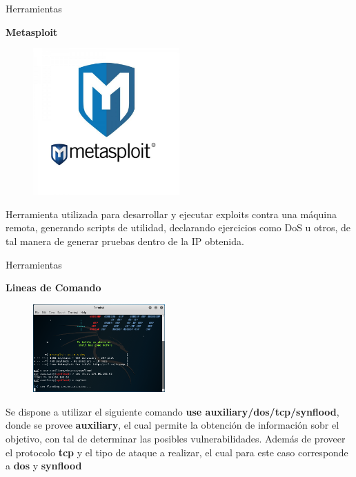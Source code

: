\begin{frame}[t,fragile]{Herramientas}

\textbf{Metasploit}

\begin{figure} 
\vspace{2pt}
  \begin{center}
    \includegraphics[width=0.5\textwidth]{meta.jpg}
    \label{fig:databaseUserTable}
  \end{center}
  \vspace{2pt}
\end{figure} 

\bigskip

 Herramienta  utilizada para desarrollar y ejecutar exploits contra una máquina remota, generando scripts de utilidad, declarando ejercicios como DoS u otros, de tal manera de generar pruebas dentro de la IP obtenida.


\end{frame}

\begin{frame}[t,fragile]{Herramientas}

\textbf{Lineas de Comando}

\begin{figure} 
\vspace{2pt}
  \begin{center}
    \includegraphics[width=0.45\textwidth]{sploit.png}
    \label{fig:databaseUserTable}
  \end{center}
  \vspace{2pt}
\end{figure} 

\bigskip

Se dispone a utilizar el siguiente comando \textbf{use auxiliary/dos/tcp/synflood}, donde se provee \textbf{auxiliary}, el cual permite la obtención de información sobr el objetivo, con tal de determinar las posibles vulnerabilidades. Además de proveer el protocolo \textbf{tcp} y  el tipo de ataque a realizar, el cual para este caso corresponde a \textbf{dos} y \textbf{synflood} 

\end{frame}

